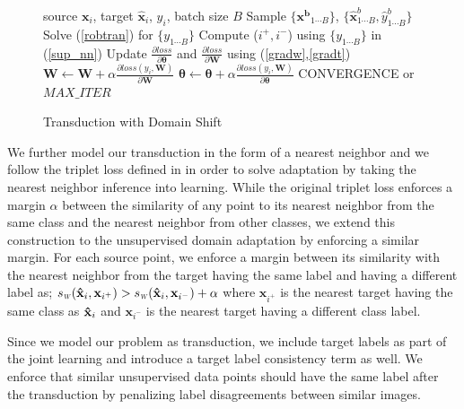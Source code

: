 \begin{figure}
    \begin{minipage}{0.5\textwidth}
    \vspace{-1cm}
\begin{algorithm}[H]
   \caption{Transduction with Domain Shift}
   \label{alg:example}
\begin{algorithmic}
    source $\mathbf{x}_i$, target $\mathbf{\hat{x}}_i$, $y_i$, batch size $B$
   \REPEAT
   \STATE  Sample $\{\mathbf{x^b}_{1 \cdots B}\}$, $\{\mathbf{\hat{x}}^b_{1 \cdots B}, \hat{y}^b_{1\cdots B}\}$
   \STATE Solve (\ref{robtran}) for $\{y_{1 \cdots B}\}$
   \STATE Compute ($i^+, i^-$) using $\{y_{1 \cdots B}\}$ in (\ref{sup_nn})
   \STATE Update $\frac{\partial loss}{\partial \mathbf{\theta}}$ and  $\frac{\partial loss}{\partial \mathbf{W}} $ using (\ref{gradw},\ref{gradt})
   \ENDIF
   \ENDFOR
   \STATE $\mathbf{W} \leftarrow \mathbf{W} + \alpha \frac{\partial loss (y_i, \mathbf{W})}{\partial \mathbf{W}}$ 
   \STATE $\mathbf{\theta} \leftarrow \mathbf{\theta} + \alpha \frac{\partial loss (y_i, \mathbf{W})}{\partial \mathbf{\theta}}$
   \UNTIL CONVERGENCE or $MAX\_ITER$
\end{algorithmic}
\end{algorithm}
\vspace{-1cm}
  \end{minipage}
  \end{figure}

We further model our transduction in the form of a nearest neighbor and we follow the triplet loss defined in \cite{lmnn} in order to solve adaptation by taking the nearest neighbor inference into learning. While the original triplet loss \cite{lmnn} enforces a margin $\alpha$ between the similarity of any point to its nearest neighbor from the same class and the nearest neighbor from other classes, we extend this construction to the unsupervised domain adaptation by enforcing a similar margin. For each source point, we enforce a margin between its similarity with the nearest neighbor from the target having the same label and having a different label as; $ \sw(\xsi,\mathbf{x}_{i^+}) > \sw(\xsi,\mathbf{x}_{i^-}) + \alpha$ where $\mathbf{x}_{i^+}$ is the nearest target having the same class as $\mathbf{\hat{x}}_i$ and $\mathbf{x}_{i^-}$ is the nearest target having a different class label.

Since we model our problem as transduction, we include target labels as part of the joint learning and introduce a target label consistency term as well. We enforce that similar unsupervised data points should have the same label after the transduction by penalizing label disagreements between similar images.


